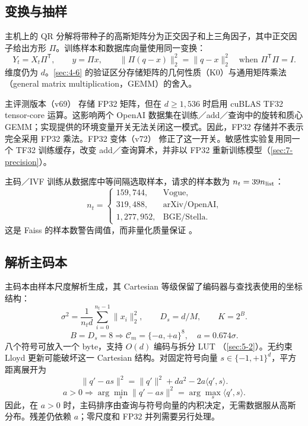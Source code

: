 \subsection{变换与抽样}

主机上的 QR 分解将带种子的高斯矩阵分为正交因子和上三角因子，其中正交因子给出方形 $\Pi$。训练样本和数据库向量使用同一变换：
\begin{equation}
 Y_t=X_t\Pi^{\mathsf T},\qquad y=\Pi x,\qquad
 \|\Pi(q-x)\|_2^2=\|q-x\|_2^2
 \quad\text{when }\Pi^{\mathsf T}\Pi=I.
 \label{eq:4-transform}
\end{equation}
维度仍为 $d$。\cref{sec:4-6} 的验证区分存储矩阵的几何性质（K0）与通用矩阵乘法（general matrix multiplication，GEMM）的舍入。

主评测版本（v69） 存储 FP32 矩阵，但在 $d\geq1{,}536$ 时启用 cuBLAS TF32 tensor-core 运算。这影响两个 OpenAI 数据集在训练／add／查询中的旋转和质心 GEMM；实现提供的环境变量开关无法关闭这一模式。因此，FP32 存储并不表示完全采用 FP32 乘法。FP32 变体（v72） 修正了这一开关。敏感性实验复用同一个 TF32 训练缓存，改变 add／查询算术，并非以 FP32 重新训练模型（\cref{sec:7-precision}）。

主码／IVF 训练从数据库中等间隔选取样本，请求的样本数为 $n_t=39n_{\rm list}$：
\[
 n_t=\begin{cases}159{,}744,&\text{Vogue},\\319{,}488,&\text{arXiv/OpenAI},\\1{,}277{,}952,&\text{BGE/Stella}.\end{cases}
\]
这是 Faiss 的样本数警告阈值，而非量化质量保证 \cite{faiss_clustering}。

\subsection{解析主码本}

主码本由样本尺度解析生成，其 Cartesian 等级保留了编码器与查找表使用的坐标结构：
\begin{equation}
 \sigma^2=\frac{1}{n_t d}\sum_{i=0}^{n_t-1}\|x_i\|_2^2,
 \qquad D_s=d/M,\qquad K=2^B.
 \label{eq:4-scale}
\end{equation}
\[
 B=D_s=8\Longrightarrow
 \mathcal C_m=\{-a,+a\}^{8},\quad a=0.674\sigma.
\]
八个符号可放入一个 byte，支持 $O(d)$ 编码与拆分 LUT \cite{jhq}（\cref{sec:5-2}）。无约束 Lloyd 更新可能破坏这一 Cartesian 结构。对固定符号向量 $s\in\{-1,+1\}^d$，平方距离展开为
\begin{equation}
 \|q'-a s\|^2=\|q'\|^2+da^2-2a\langle q',s\rangle.
 \label{eq:4-sign-ranking}
\end{equation}
\[
 a>0\Longrightarrow
 \arg\min_s\|q'-as\|^2=\arg\max_s\langle q',s\rangle.
\]
因此，在 $a>0$ 时，主码排序由查询与符号向量的内积决定，无需数据服从高斯分布。残差仍依赖 $a$；零尺度和 FP32 并列需要另行处理。

